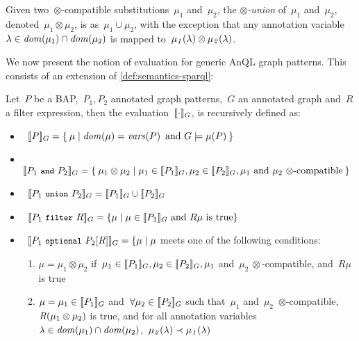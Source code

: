 \begin{definition}
  Given two~$\otimes$-compatible substitutions~$\mu_1$ and~$\mu_2$, the \emph{$\otimes$-union} of~$\mu_1$ and~$\mu_2$,
  denoted~$\mu_1 \otimes \mu_2$, is as~$\mu_{1} \cup \mu_{2}$, with the exception that any annotation variable~$\lambda
  \in \mathit{dom}\!\left(\mu_1\right) \cap \mathit{dom}\!\left(\mu_2\right)$ is mapped to~$\mathit{\mu_1}\!\left(\lambda\right) \otimes \mathit{\mu_2}\!\left(\lambda\right)$.
\end{definition}

We now present the notion of evaluation for generic AnQL graph patterns.  This consists of an extension of
\cref{def:semantics-sparql}:

\begin{definition}
  \label{def:semantics-anql}
  Let~$P$ be a \ac{BAP},~$P_{1}, P_{2}$ annotated graph patterns,~$G$ an annotated graph and~$R$ a filter expression, then
  the evaluation~$[\![ \cdot ]\!]_{G}$, is recursively defined as:
  \begin{center}
    \begin{itemize}[noitemsep]
    \item~$[\![ P ]\!]_{G} = \left\{\:\mu \mid \mathit{dom}\!\left(\mu\right) = \mathit{vars}\!\left(P\right)\textrm{ and }G\models \mathit{\mu}\!\left(P\right) \:\right\}$
    \item~$[\![ P_1\ \texttt{{\small and}}\ P_2 ]\!]_{G} = \left\{\: \mu_1\otimes\mu_2 \mid \mu_1 \in [\![ P_1 ]\!]_{G}, \mu_2 \in
      [\![ P_2 ]\!]_{G},\mu_1\textrm{ and }\mu_2\textrm{~$\otimes$-compatible} \:\right\}$
    \item~$[\![ P_1\ \texttt{{\small union}}\ P_2 ]\!]_{G} = [\![ P_1 ]\!]_{G} \cup [\![ P_2 ]\!]_{G}$
    \item~$[\![ P_1\ \texttt{{\small filter}}\ R ]\!]_{G} = \left\{\mu \mid \mu \in [\![ P_1 ]\!]_{G} \mbox{ and } R\mu \textrm{ is true} \right\}$
    \item~$[\![ P_1\ \texttt{{\small optional}}\ P_2[R] ]\!]_{G} = \{ \mu \mid \mu$ meets one of the following conditions: 
      \begin{enumerate}[nosep]
      \item $\mu = \mu_1 \otimes \mu_2$ if~$\mu_1 \in [\![ P_1 ]\!]_{G}, \mu_2 \in [\![ P_2 ]\!]_{G}, \mu_1$ and~$\mu_2~\otimes$-compatible, and~$R\mu$ is true
      \item $\mu = \mu_1 \in [\![ P_1 ]\!]_{G}$ and~$\forall\mu_2 \in [\![ P_2 ]\!]_{G}$ such that~$\mu_1$
        and~$\mu_2$~$\otimes$-compatible,~$\mathit{R}\!\left(\mu_1\otimes\mu_2\right)$ is true, and for all annotation
        variables~$\lambda\in \mathit{dom}\!\left(\mu_1\right) \cap \mathit{dom}\!\left(\mu_2\right)$,~$\mathit{\mu_2}\!\left(\lambda\right) \prec \mathit{\mu_1}\!\left(\lambda\right)$

\end{enumerate}
\end{itemize}
\end{center}
\end{definition}

